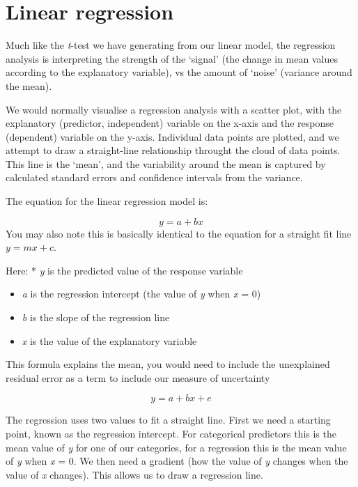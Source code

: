 \documentclass[
]{book}
\begin{document}
\hypertarget{linear-regression}{%
\section{Linear regression}\label{linear-regression}}

Much like the \emph{t}-test we have generating from our linear model, the regression analysis is interpreting the strength of the `signal' (the change in mean values according to the explanatory variable), vs the amount of `noise' (variance around the mean).

We would normally visualise a regression analysis with a scatter plot, with the explanatory (predictor, independent) variable on the x-axis and the response (dependent) variable on the y-axis. Individual data points are plotted, and we attempt to draw a straight-line relationship throught the cloud of data points. This line is the `mean', and the variability around the mean is captured by calculated standard errors and confidence intervals from the variance.

The equation for the linear regression model is:

\[ y = a + bx \]
You may also note this is basically identical to the equation for a straight fit line \(y = mx +c\).

Here:
* \emph{y} is the predicted value of the response variable

\begin{itemize}
\item
  \emph{a} is the regression intercept (the value of \emph{y} when \emph{x} = 0)
\item
  \emph{b} is the slope of the regression line
\item
  \emph{x} is the value of the explanatory variable
\end{itemize}

This formula explains the mean, you would need to include the unexplained residual error as a term to include our measure of uncertainty

\[ y = a + bx + e \]

The regression uses two values to fit a straight line. First we need a starting point, known as the regression intercept. For categorical predictors this is the mean value of \emph{y} for one of our categories, for a regression this is the mean value of \emph{y} when \emph{x} = 0. We then need a gradient (how the value of \emph{y} changes when the value of \emph{x} changes). This allows us to draw a regression line.
\end{document}
